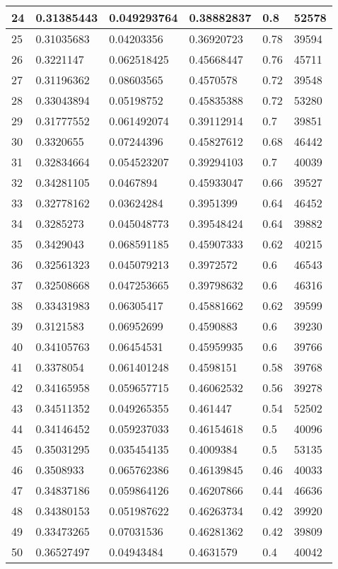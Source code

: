 \begin{longtable}{|l|l|l|l|l|l|}
24 & 0.31385443 & 0.049293764 & 0.38882837 & 0.8 & 52578 \\ \hline 
25 & 0.31035683 & 0.04203356 & 0.36920723 & 0.78 & 39594 \\ \hline 
26 & 0.3221147 & 0.062518425 & 0.45668447 & 0.76 & 45711 \\ \hline 
27 & 0.31196362 & 0.08603565 & 0.4570578 & 0.72 & 39548 \\ \hline 
28 & 0.33043894 & 0.05198752 & 0.45835388 & 0.72 & 53280 \\ \hline 
29 & 0.31777552 & 0.061492074 & 0.39112914 & 0.7 & 39851 \\ \hline 
30 & 0.3320655 & 0.07244396 & 0.45827612 & 0.68 & 46442 \\ \hline 
31 & 0.32834664 & 0.054523207 & 0.39294103 & 0.7 & 40039 \\ \hline 
32 & 0.34281105 & 0.0467894 & 0.45933047 & 0.66 & 39527 \\ \hline 
33 & 0.32778162 & 0.03624284 & 0.3951399 & 0.64 & 46452 \\ \hline 
34 & 0.3285273 & 0.045048773 & 0.39548424 & 0.64 & 39882 \\ \hline 
35 & 0.3429043 & 0.068591185 & 0.45907333 & 0.62 & 40215 \\ \hline 
36 & 0.32561323 & 0.045079213 & 0.3972572 & 0.6 & 46543 \\ \hline 
37 & 0.32508668 & 0.047253665 & 0.39798632 & 0.6 & 46316 \\ \hline 
38 & 0.33431983 & 0.06305417 & 0.45881662 & 0.62 & 39599 \\ \hline 
39 & 0.3121583 & 0.06952699 & 0.4590883 & 0.6 & 39230 \\ \hline 
40 & 0.34105763 & 0.06454531 & 0.45959935 & 0.6 & 39766 \\ \hline 
41 & 0.3378054 & 0.061401248 & 0.4598151 & 0.58 & 39768 \\ \hline 
42 & 0.34165958 & 0.059657715 & 0.46062532 & 0.56 & 39278 \\ \hline 
43 & 0.34511352 & 0.049265355 & 0.461447 & 0.54 & 52502 \\ \hline 
44 & 0.34146452 & 0.059237033 & 0.46154618 & 0.5 & 40096 \\ \hline 
45 & 0.35031295 & 0.035454135 & 0.4009384 & 0.5 & 53135 \\ \hline 
46 & 0.3508933 & 0.065762386 & 0.46139845 & 0.46 & 40033 \\ \hline 
47 & 0.34837186 & 0.059864126 & 0.46207866 & 0.44 & 46636 \\ \hline 
48 & 0.34380153 & 0.051987622 & 0.46263734 & 0.42 & 39920 \\ \hline 
49 & 0.33473265 & 0.07031536 & 0.46281362 & 0.42 & 39809 \\ \hline 
50 & 0.36527497 & 0.04943484 & 0.4631579 & 0.4 & 40042 \\ \hline 
\end{longtable}